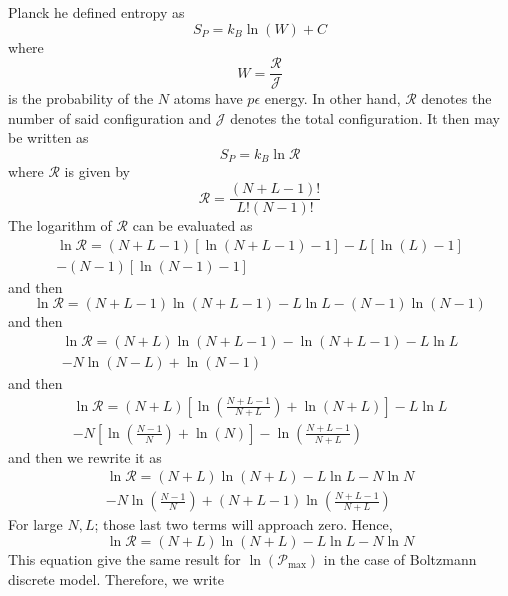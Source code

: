 \documentclass[../../../Main.tex]{subfiles}
\begin{document}
Planck he defined entropy as 
\begin{equation*}
    S_P=k_B\ln (W)+C
\end{equation*}
where
\begin{equation*}
    W=\frac{\mathcal{R}}{\mathcal{J}}
\end{equation*}
is the probability of the $N$ atoms have $p\epsilon$ energy. In other hand, $\mathcal{R}$ denotes the number of said configuration and $\mathcal{J}$ denotes the total configuration. It then may be written as
\begin{equation*}
    S_P=k_B\ln \mathcal{R}
\end{equation*}
where $\mathcal{R}$ is given by 
\begin{equation*}
    \mathcal{R}=\frac{(N+L-1)!}{L!(N-1)!}
\end{equation*}
The logarithm of $\mathcal{R}$ can be evaluated as
\begin{multline*}
    \ln \mathcal{R}=(N+L-1)[\ln (N+L-1)-1]-L[\ln (L)-1]\\
    -(N-1)[\ln(N-1)-1]
\end{multline*}
and then
\begin{equation*}
    \ln \mathcal{R}=(N+L-1)\ln(N+L-1)-L\ln L-(N-1)\ln(N-1)
\end{equation*}
and then 
\begin{multline*}
    \ln \mathcal{R}=(N+L)\ln(N+L-1)-\ln(N+L-1)-L\ln L \\
    -N\ln(N-L)+\ln(N-1)
\end{multline*}
and then 
\begin{multline*}
    \ln \mathcal{R}=(N+L)\left[\ln\left(\frac{N+L-1}{N+L}\right) +\ln\left(N+L\right)\right]-L\ln L \\
    -N\left[\ln \left(\frac{N-1}{N}\right)+\ln (N)\right]-\ln\left(\frac{N+L-1}{N+L}\right)
\end{multline*}
and then we rewrite it as
\begin{multline*}
    \ln \mathcal{R}=(N+L)\ln(N+L) -L\ln L - N\ln N \\
    -N\ln\left(\frac{N-1}{N}\right) +(N+L-1)\ln\left(\frac{N+L-1}{N+L}\right)
\end{multline*}
For large $N,L$; those last two terms will approach zero. Hence,
\begin{equation*}
    \ln \mathcal{R}=(N+L)\ln(N+L) -L\ln L - N\ln N 
\end{equation*}
This equation give the same result for $\ln(\mathcal{P}_\text{max})$ in the case of Boltzmann discrete model. Therefore, we write 
\end{document}
